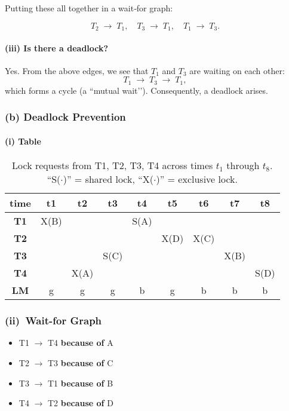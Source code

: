 \documentclass[11pt]{article}
\begin{document}
\noindent
Putting these all together in a wait‐for graph:

\[
  T_2 \;\longrightarrow\; T_1,\quad 
  T_3 \;\longrightarrow\; T_1,\quad
  T_1 \;\longrightarrow\; T_3.
\]

\paragraph{(iii) Is there a deadlock?}

Yes.  From the above edges, we see that \(T_1\) and \(T_3\) are waiting on each other:
\[
  T_1 \;\longrightarrow\; T_3 \;\longrightarrow\; T_1,
\]
which forms a cycle (a ``mutual wait’’).  Consequently, a deadlock arises. 

\subsubsection*{(b) \; Deadlock Prevention}

\paragraph{(i) Table}

\begin{table}[!htbp]
\centering
\begin{tabular}{c|cccccccc}
\textbf{time} & \textbf{t1} & \textbf{t2} & \textbf{t3} & \textbf{t4} & \textbf{t5} & \textbf{t6} & \textbf{t7} & \textbf{t8} \\
\hline
\textbf{T1} & X(B) &        &      & S(A)   &        &        &        &        \\
\textbf{T2} &      &        &      &        & X(D)   & X(C)   &        &        \\
\textbf{T3} &      &        & S(C) &        &        &        & X(B)   &        \\
\textbf{T4} &      & X(A)   &      &        &        &        &        & S(D)   \\
\hline
\textbf{LM} & g    & g      & g    & b      & g      & b      & b      & b
\end{tabular}
\caption{Lock requests from T1, T2, T3, T4 across times \(t_1\) through \(t_8\). 
``S(\(\cdot\))'' = shared lock, ``X(\(\cdot\))'' = exclusive lock.}
\end{table}

\newpage
\subsubsection*{(ii)~Wait-for Graph}
\begin{itemize}
  \item T1 $\rightarrow$ T4 \textbf{because of} A
  \item T2 $\rightarrow$ T3 \textbf{because of} C
  \item T3 $\rightarrow$ T1 \textbf{because of} B
  \item T4 $\rightarrow$ T2 \textbf{because of} D
\end{itemize}
\end{document}
